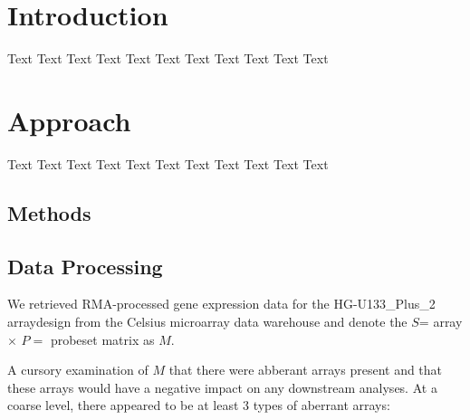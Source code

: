 \documentclass{bioinfo}
\begin{document}
\section{Introduction}
Text Text Text  Text Text Text Text Text Text Text Text


\section{Approach}
Text Text Text  Text Text Text Text Text Text Text Text

\begin{methods}
\section{Methods}


\subsection{Data Processing}\label{Processing}

We retrieved RMA-processed gene expression data for the HG-U133\_Plus\_2
arraydesign from the Celsius microarray data warehouse \cite{rma,celsius} and
denote the $S$= array $\times$ $P=$ probeset matrix
as $M$. %


A cursory examination of $M$ that there were abberant arrays present and that
these arrays would have a negative impact on any downstream analyses.  At a
coarse level, there appeared to be at least 3 types of aberrant arrays:


\end{methods}
\end{document}
